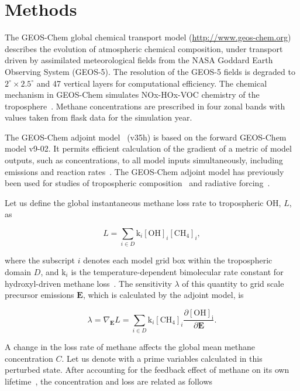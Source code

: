 \section{Methods}

The GEOS-Chem global chemical transport model (\url{http://www.geos-chem.org}) describes the evolution of atmospheric chemical composition, under transport driven by assimilated meteorological fields from the NASA Goddard Earth Observing System (GEOS-5). The resolution of the GEOS-5 fields is degraded to $2^{\circ} \times 2.5^{\circ}$ and 47 vertical layers for computational efficiency. The chemical mechanism in GEOS-Chem simulates NOx-HOx-VOC chemistry of the troposphere~\citep{ref:mao2010}. Methane concentrations are prescribed in four zonal bands with values taken from flask data for the simulation year.


The GEOS-Chem adjoint model~\cite{ref:henze2007} (v35h) is based on the forward GEOS-Chem model v9-02. It permits efficient calculation of the gradient of a metric of model outputs, such as concentrations, to all model inputs simultaneously, including emissions and reaction rates~\cite{ref:walker2016}. The GEOS-Chem adjoint model has previously been used for studies of tropospheric composition~\citep{ref:zhang2009, ref:walker2012} and radiative forcing~\citep{ref:bowman2012}.

Let us define the global instantaneous methane loss rate to tropospheric OH, $L$, as

\begin{equation}
L=\sum_{i \in D} \mathrm{k}_i \mathrm{[OH]}_i \mathrm{[CH_4]}_i,
\end{equation}

where the subscript $i$ denotes each model grid box within the tropospheric domain $D$, and $\mathrm{k}_i$ is the temperature-dependent bimolecular rate constant for hydroxyl-driven methane loss~\citep{ref:sander2011}. The sensitivity $\lambda$ of this quantity to grid scale precursor emissions $\mathbf{E}$, which is calculated by the adjoint model, is

\begin{equation}
\lambda = \nabla_\mathbf{E} L = \sum_{i \in D} \mathrm{k}_i \mathrm{[CH_4]}_i \frac{\partial \mathrm{[OH]_i}}{\partial \mathbf{E}}.
\end{equation}

A change in the loss rate of methane affects the global mean methane concentration $C$. Let us denote with a prime variables calculated in this perturbed state. After accounting for the feedback effect of methane on its own lifetime~\citep{ref:fuglestvedt1999,ref:naik2005}, the concentration and loss are related as follows

